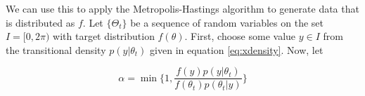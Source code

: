 \documentclass[11pt]{article}
\numberwithin{equation}{section}
\numberwithin{figure}{section}
\begin{document}
We can use this to apply the Metropolis-Hastings algorithm \cite{Metropolis} to generate data that is distributed as $f$. Let $\{\Theta_t\}$ be a sequence of random variables on the set $I = [0,2\pi)$ with target distribution $f(\theta)$. First, choose some value $y \in I$ from the transitional density $p(y|\theta_t)$ given in equation \ref{eq:xdensity}. Now, let

\begin{equation}\label{eq:alpha}
\alpha = \min\{1,\frac{f(y)p(y|\theta_t)}{f(\theta_t)p(\theta_t|y)}\}
\end{equation}

\begin{figure}[h]
\centering
{}
\newline
{}
\end{figure}
\end{document}
